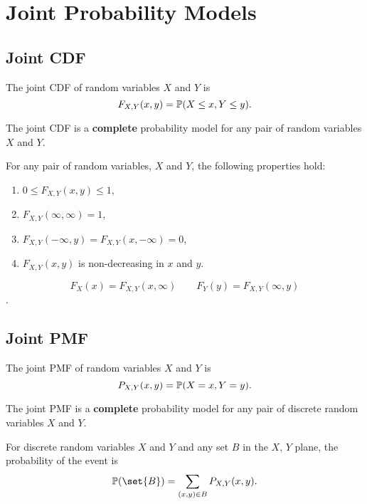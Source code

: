 \chapter{Joint Probability Models}

\section{Joint CDF}
\begin{definition}
    The joint CDF of random variables $X$ and $Y$ is
    \[F_{X,Y}(x,y) = \P{X\leq x, Y\leq y}.\]
\end{definition}

The joint CDF is a \textbf{complete} probability model for any pair of random variables $X$ and $Y$.

\begin{theorem}
    For any pair of random variables, $X$ and $Y$, the following properties hold:
    \begin{enumerate}
        \item $0 \leq F_{X,Y}(x,y) \leq 1$,
        \item $F_{X,Y}(\infty,\infty)=1$,
        \item $F_{X,Y}(-\infty,y)=F_{X,Y}(x,-\infty)=0$,
        \item $F_{X,Y}(x,y)$ is non-decreasing in $x$ and $y$.
    \end{enumerate}
\end{theorem}

\begin{definition}
    \[F_X(x)=F_{X,Y}(x,\infty) \qquad F_Y(y)=F_{X,Y}(\infty,y)\].
\end{definition}

\section{Joint PMF}
\begin{definition}
    The joint PMF of random variables $X$ and $Y$ is
    \[P_{X,Y}(x,y) = \P{X=x, Y=y}.\]
\end{definition}

The joint PMF is a \textbf{complete} probability model for any pair of discrete random variables $X$ and $Y$.

\begin{theorem}
    For discrete random variables $X$ and $Y$ and any set $B$ in the $X$, $Y$ plane, the probability of the event
    is
    \[\P{\set{B}}=\sum_{(x,y)\in B}P_{X,Y}(x,y).\]
\end{theorem}

